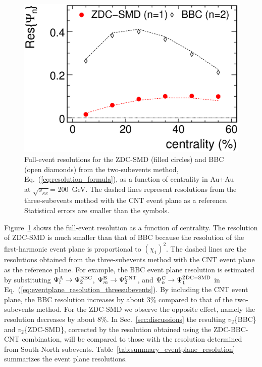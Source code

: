 \documentclass[aps,prc,superscriptaddress,showpacs,floatfix,twocolumn]{revtex4}
\newcommand \sqsn{\mbox{$\sqrt{s_{_{NN}}}$}\xspace}
\newcommand \Au{{Au+Au}\xspace}
\begin{document}
\begin{figure}[t]
\includegraphics[width=1.0\linewidth]{eventplane_resolution_twosubevents.eps}
\caption{\label{fig:eventplane_resolution_twosubevents}
Full-event resolutions for the ZDC-SMD (filled circles) and BBC (open diamonds) from 
the two-subevents method, Eq.~(\ref{eq:resolution_formula}), as a function of centrality 
in \Au at \sqsn = 200~GeV. The dashed lines represent resolutions from the three-subevents 
method with the CNT event plane as a reference. Statistical errors are smaller than the symbols.
}
\end{figure}
Figure~\ref{fig:eventplane_resolution_twosubevents} shows the full-event resolution as a function 
of centrality. The resolution of ZDC-SMD is much smaller than that of BBC because the resolution 
of the first-harmonic event plane is proportional to $(\chi_1)^2$. The dashed lines are the resolutions 
obtained from the three-subevents method with the CNT event plane as the reference plane. For 
example, the BBC event plane resolution is estimated by substituting 
$\Psi_l^{\rm A} \rightarrow \Psi_2^{\rm BBC}$, $\Psi_m^{\rm B} \rightarrow \Psi_2^{\rm CNT}$, and
$\Psi_n^{\rm C} \rightarrow \Psi_1^{\rm ZDC-SMD}$ in Eq.~(\ref{eq:eventplane_resolution_threesubevents}). 
By including the CNT event plane, the BBC resolution increases by about 3\% compared to that of the 
two-subevents method. For the ZDC-SMD we observe the opposite effect, namely the resolution 
decreases by about 8\%. In Sec.~\ref{sec:discussions} the resulting $v_2$\{BBC\} and $v_2$\{ZDC-SMD\}, 
corrected by the resolution obtained using the ZDC-BBC-CNT combination, will be compared to those 
with the resolution determined from South-North subevents.
Table~\ref{tab:summary_eventplane_resolution}
summarizes the event plane resolutions.
\end{document}
